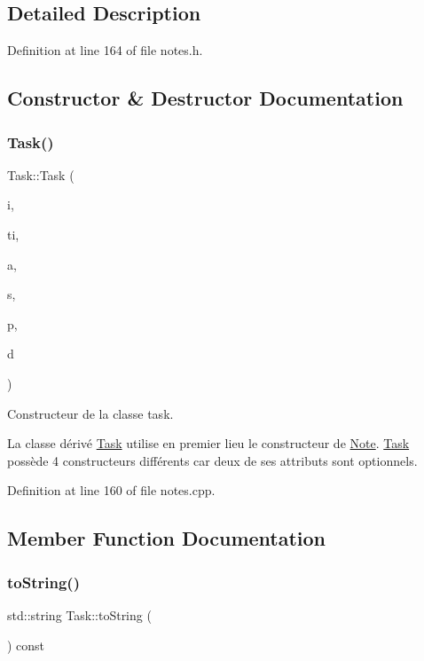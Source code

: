 \subsection{Detailed Description}


Definition at line 164 of file notes.\+h.



\subsection{Constructor \& Destructor Documentation}
\mbox{\label{class_task_a08a0f57803d8ef35f687f23f759e9f0c}} 
\subsubsection{\texorpdfstring{Task()}{Task()}}
{\footnotesize\ttfamily Task\+::\+Task (\begin{DoxyParamCaption}\item[{const Q\+String \&}]{i,  }\item[{const Q\+String \&}]{ti,  }\item[{const Q\+String \&}]{a,  }\item[{E\+N\+U\+M\+::\+Status\+Type}]{s,  }\item[{unsigned int}]{p,  }\item[{const Q\+Date\+Time}]{d }\end{DoxyParamCaption})}



Constructeur de la classe task. 

La classe dérivé \hyperlink{class_task}{Task} utilise en premier lieu le constructeur de \hyperlink{class_note}{Note}. \hyperlink{class_task}{Task} possède 4 constructeurs différents car deux de ses attributs sont optionnels. 

Definition at line 160 of file notes.\+cpp.



\subsection{Member Function Documentation}
\mbox{\label{class_task_a7fe5cb7b57a21693e7abfea2f9618563}} 
\subsubsection{\texorpdfstring{to\+String()}{toString()}}
{\footnotesize\ttfamily std\+::string Task\+::to\+String (\begin{DoxyParamCaption}{ }\end{DoxyParamCaption}) const\hspace{0.3cm}{\ttfamily [virtual]}}



